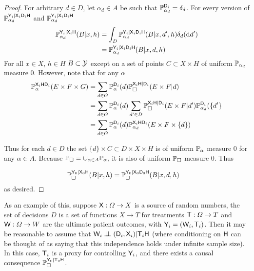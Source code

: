 \begin{proof}
For arbitrary $d\in D$, let $\alpha_d\in A$ be such that $\mathbb{P}_{\alpha_d}^{\mathsf{D}_i}=\delta_{d}$. For every version of $\mathbb{P}_{\alpha_d}^{\mathsf{Y}_i|\mathsf{X}_i\mathsf{D}_i\mathsf{H}}$ and $\mathbb{P}_{\alpha_d}^{\mathsf{Y}_i|\mathsf{X}_i\mathsf{D}_i\mathsf{H}}$
\begin{align}
    \mathbb{P}_{\alpha_d}^{\mathsf{Y}_i|\mathsf{X}_i\mathsf{H}}(B|x,h) &= \int_{D}\mathbb{P}_{\alpha_d}^{\mathsf{Y}_i|\mathsf{X}_i\mathsf{D}_i\mathsf{H}}(B|x,d',h)\delta_d(\mathrm{d}d')\\
                                                         &= \mathbb{P}_{\alpha_d}^{\mathsf{Y}_i|\mathsf{X}_i\mathsf{D}_i\mathsf{H}}(B|x,d,h)
\end{align}
For all $x\in X$, $h\in H$ $B\subset\mathcal{Y}$ except on a set of points $C\subset X\times H$ of uniform $\mathbb{P}_{\alpha_d}$ measure 0.
However, note that for any $\alpha$
\begin{align}
    \mathbb{P}_\alpha^{\mathsf{X}_i\mathsf{H}\mathsf{D}_i}(E\times F\times G) &= \sum_{d\in G} \mathbb{P}_\alpha^{\mathsf{D}_i}(d)\mathbb{P}_\square^{\mathsf{X}_i\mathsf{H}|\mathsf{D}_i}(E\times F|d)\\
                                                                  &= \sum_{d\in G} \mathbb{P}_\alpha^{\mathsf{D}_i}(d)\sum_{d'\in D}\mathbb{P}_\square^{\mathsf{X}_i\mathsf{H}|\mathsf{D}_i}(E\times F|d')\mathbb{P}_{\alpha_d}^{\mathsf{D}_i}(\{d'\}\\
                                                                  &= \sum_{d\in G} \mathbb{P}_\alpha^{\mathsf{D}_i}(d)\mathbb{P}_{\alpha_d}^{\mathsf{X}_i\mathsf{H}\mathsf{D}_i}(E\times F\times\{d\})
\end{align}

Thus for each $d\in D$ the set $\{d\}\times C\subset D\times X\times H$ is of uniform $\mathbb{P}_\alpha$ measure 0 for any $\alpha\in A$. Because $\mathbb{P}_\square=\cup_{\alpha\in A}\mathbb{P}_\alpha$, it is also of uniform $\mathbb{P}_\square$ measure 0. Thus 

\begin{align}
    \mathbb{P}_{\square}^{\mathsf{Y}_0|\mathsf{X}_0\mathsf{H}}(B|x,h) &= \mathbb{P}_{\square}^{\mathsf{Y}_0|\mathsf{X}_0\mathsf{D}_0\mathsf{H}}(B|x,d,h)
\end{align}
as desired.
\end{proof}

As an example of this, suppose $\mathsf{X}:\Omega\to X$ is a source of random numbers, the set of decisions $D$ is a set of functions $X\to T$ for treatments $\mathsf{T}:\Omega\to T$ and $\mathsf{W}:\Omega\to W$ are the ultimate patient outcomes, with $\mathsf{Y}_i=(\mathsf{W}_i,\mathsf{T}_i)$. Then it may be reasonable to assume that $\RV{W}_i\CI(\RV{D}_i,\RV{X}_i)|\RV{T}_i\RV{H}$ (where conditioning on $\mathsf{H}$ can be thought of as saying that this independence holds under infinite sample size). In this case, $\mathsf{T}_i$ is a proxy for controlling $\mathsf{Y}_i$, and there exists a causal consequence $\mathbb{P}_\square^{\mathsf{Y}_0|\mathsf{T}_0\mathsf{H}}$.

